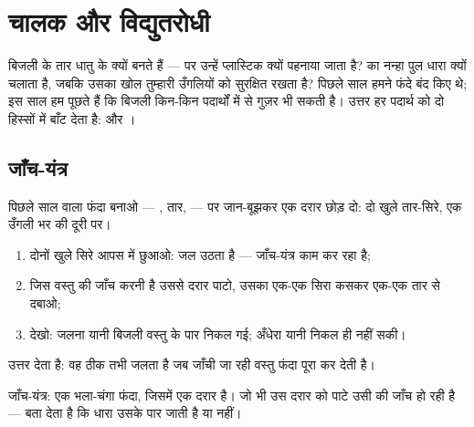 \chapter{चालक और विद्युतरोधी}\label{ch:g4:conductors-insulators}

बिजली के तार धातु के क्यों बनते हैं --- पर उन्हें प्लास्टिक क्यों
पहनाया जाता है?  का नन्हा पुल धारा क्यों चलाता है, जबकि उसका
खोल तुम्हारी उँगलियों को सुरक्षित रखता है? पिछले साल हमने फंदे बंद
किए थे; इस साल हम पूछते हैं कि बिजली किन-किन पदार्थों में से गुज़र भी
सकती है। उत्तर हर पदार्थ को दो हिस्सों में बाँट देता है:  और
।

\section{जाँच-यंत्र}

\begin{method}[जाँच-यंत्र बनाना]\label{met:g4:conductors-insulators:tester}
पिछले साल वाला फंदा बनाओ --- , तार,  --- पर जान-बूझकर एक
दरार छोड़ दो: दो खुले तार-सिरे, एक उँगली भर की दूरी पर।
\begin{enumerate}
  \item दोनों खुले सिरे आपस में छुआओ:  जल उठता है --- जाँच-यंत्र
        काम कर रहा है;
  \item जिस वस्तु की जाँच करनी है उससे दरार पाटो, उसका एक-एक सिरा
        कसकर एक-एक तार से दबाओ;
  \item {} देखो: जलना यानी बिजली वस्तु के पार निकल गई; अँधेरा यानी
        निकल ही नहीं सकी।
\end{enumerate}
उत्तर  देता है: वह ठीक तभी जलता है जब जाँची जा रही वस्तु फंदा पूरा
कर देती है।
\end{method}

\begin{omfigure}

{\small जाँच-यंत्र: एक भला-चंगा फंदा, जिसमें एक दरार है। जो भी उस दरार
को पाटे उसी की जाँच हो रही है ---  बता देता है कि धारा उसके पार
जाती है या नहीं।}
\end{omfigure}

